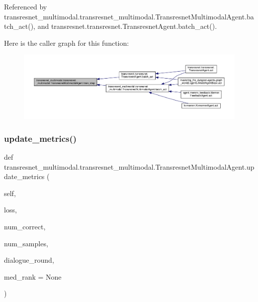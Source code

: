 Referenced by transresnet\+\_\+multimodal.\+transresnet\+\_\+multimodal.\+Transresnet\+Multimodal\+Agent.\+batch\+\_\+act(), and transresnet.\+transresnet.\+Transresnet\+Agent.\+batch\+\_\+act().

Here is the caller graph for this function\+:
\nopagebreak
\begin{figure}[H]
\begin{center}
\leavevmode
\includegraphics[width=350pt]{classtransresnet__multimodal_1_1transresnet__multimodal_1_1TransresnetMultimodalAgent_a7a753d1b9c14dfed7cb4557051f14115_icgraph}
\end{center}
\end{figure}
\mbox{\label{classtransresnet__multimodal_1_1transresnet__multimodal_1_1TransresnetMultimodalAgent_a2469ded22fbb2c690a814b54f51791d4}} 
\subsubsection{\texorpdfstring{update\+\_\+metrics()}{update\_metrics()}}
{\footnotesize\ttfamily def transresnet\+\_\+multimodal.\+transresnet\+\_\+multimodal.\+Transresnet\+Multimodal\+Agent.\+update\+\_\+metrics (\begin{DoxyParamCaption}\item[{}]{self,  }\item[{}]{loss,  }\item[{}]{num\+\_\+correct,  }\item[{}]{num\+\_\+samples,  }\item[{}]{dialogue\+\_\+round,  }\item[{}]{med\+\_\+rank = {\ttfamily None} }\end{DoxyParamCaption})}

